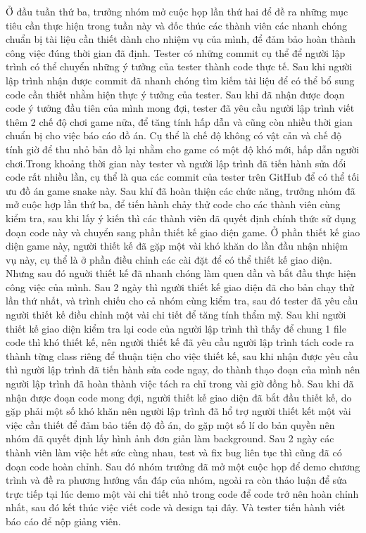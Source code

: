 \documentclass{article}
\begin{document}
Ở đầu tuần thứ ba, trưởng nhóm mở cuộc họp lần thứ hai để đề ra những mục tiêu cần thực hiện trong tuần này và đốc thúc các thành viên các nhanh chóng chuẩn bị tài liệu cần thiết dành cho nhiệm vụ của mình, để đảm bảo hoàn thành công việc đúng thời gian đã định. Tester có những commit cụ thể để người lập trình  có thể chuyển những ý tưởng của tester thành code thực tế. Sau khi người lập trình nhận được commit đã nhanh chóng tìm kiếm tài liệu để có thể bổ sung code cần thiết nhằm hiện thực ý tưởng của tester. Sau khi đã nhận được đoạn code ý tưởng đầu tiên của mình mong đợi, tester đã yêu cầu người lập trình viết thêm 2 chế độ chơi game nữa, để tăng tính hấp dẫn và cũng còn nhiều thời gian chuẩn bị cho việc báo cáo đồ án. Cụ thể là chế độ không có vật cản và chế độ tính giờ để thu nhỏ bản đồ lại nhằm cho game có một độ khó mới, hấp dẫn người chơi.Trong khoảng thời gian này tester và người lập trình đã tiến hành sửa đổi code rất nhiều lần, cụ thể là qua các commit của tester trên GitHub để có thể tối ưu đồ án game snake này. Sau khỉ đã hoàn thiện các chức năng, trưởng nhóm đã mở cuộc hợp lần thứ ba, để tiến hành chảy thử code cho các thành viên cùng kiểm tra, sau khi lấy ý kiến thì các thành viên đã quyết định chính thức sử dụng đoạn code này và chuyển sang phần thiết kế giao diện game. Ở phần thiết kế giao diện game này, người thiết kế đã gặp một vài khó khăn do lần đầu nhận nhiệm vụ này, cụ thể là ở phần điều chỉnh các cài đặt để có thể thiết kế giao diện. Nhưng sau đó nguời thiết kế đã nhanh chóng làm quen dần và bắt đầu thực hiện công việc của mình. Sau 2 ngày thì người thiết kế giao diện đã cho bản chạy thử lần thứ nhất, và trình chiếu cho cả nhóm cùng kiểm tra, sau đó tester đã yêu cầu người thiết kế điều chỉnh một vài chi tiết để tăng tính thẩm mỹ. Sau khi người thiết kế giao diện kiểm tra lại code của người lập trình thì thấy để chung 1 file code thì khó thiết kế, nên người thiết kế đã yêu cầu người lập trình tách code ra thành từng class riêng để thuận tiện cho việc thiết kế, sau khi nhận được yêu cầu thì người lập trình đã tiến hành sửa code ngay, do thành thạo đoạn của mình nên người lập trình đã hoàn thành việc tách ra chỉ trong vài giờ đồng hồ. Sau khi đã nhận được đoạn code mong đợi, người thiết kế giao diện đã bắt đầu thiết kế, do gặp phải một số khó khăn nên người lập trình đã hổ trợ người thiết kết một vài việc cần thiết để đảm bảo tiến độ đồ án, do gặp một số lí do bản quyền nên nhóm  đã quyết định lấy hình ảnh đơn giản làm background. Sau 2 ngày các thành viên làm việc hết sức cùng nhau, test và fix bug liên tục thì cũng đã có đoạn code hoàn chỉnh. Sau đó nhóm trưởng đã mở một cuộc họp để demo chương trình và đề ra phương hướng vấn đáp của nhóm, ngoài ra còn thảo luận để sửa trực tiếp tại lúc demo một vài chi tiết nhỏ trong code để code trở nên hoàn chỉnh nhất, sau đó kết thúc việc viết code và design tại đây. Và tester tiến hành viết báo cáo để nộp giảng viên.\\
\end{document}
